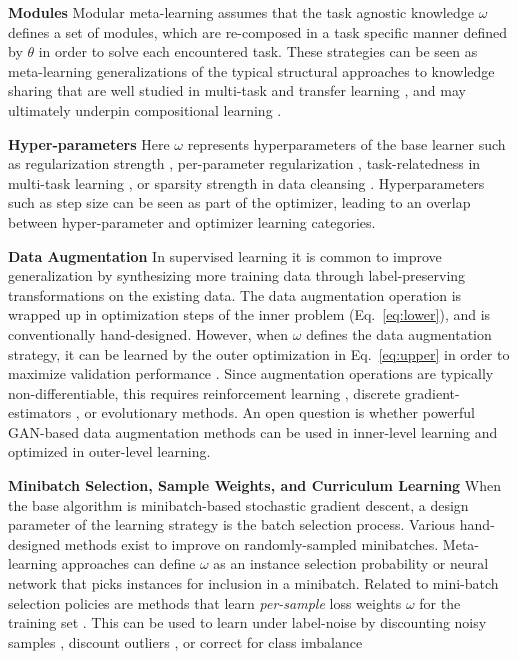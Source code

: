 \documentclass[10pt,journal,compsoc]{IEEEtran}
\newcommand{\keypoint}[1]{\vspace{0.1cm}\noindent\textbf{#1}\quad}
\begin{document}
\keypoint{Modules} Modular meta-learning \cite{alet2018modularmetalearning,alet2019modularmeta} assumes that the task agnostic knowledge $\omega$ defines a set of modules, which are re-composed in a task specific manner defined by $\theta$ in order to solve each encountered task. These strategies can be seen as meta-learning generalizations of the typical structural approaches to knowledge sharing that are well studied in multi-task and transfer learning \cite{yang2017deepmtrl,fernando2017pathnet,meyerson2019modular}, and may ultimately underpin compositional learning \cite{lake2019compositional}.

\keypoint{Hyper-parameters} Here $\omega$ represents hyperparameters of the base learner such as regularization strength \cite{franceschi2018bilevel, micaelli2020nongreedy}, per-parameter regularization \cite{balaji2018metareg}, task-relatedness in multi-task learning \cite{franceschi2017hyperopt}, or sparsity strength in data cleansing \cite{franceschi2017hyperopt}. Hyperparameters such as step size \cite{li2017meta,antoniou2018maml, micaelli2020nongreedy} can be seen as part of the optimizer, leading to an overlap between hyper-parameter and optimizer learning categories.



\keypoint{Data Augmentation} In supervised learning it is common to improve generalization by synthesizing more training data through label-preserving transformations on the existing data. The data augmentation operation is wrapped up in optimization steps of the inner problem (Eq.~\ref{eq:lower}), and is conventionally hand-designed. However, when $\omega$ defines the data augmentation strategy, it can be learned by the outer optimization in Eq.~\ref{eq:upper} in order to maximize validation performance \cite{cubuk2019autoaug}. Since augmentation operations are typically non-differentiable, this requires reinforcement learning \cite{cubuk2019autoaug}, discrete gradient-estimators \cite{li2020dada}, or evolutionary \cite{volpi2019learnaugment} methods. An open question is whether powerful GAN-based data augmentation methods \cite{antoniou2017data} can be used in inner-level learning and optimized in outer-level learning.



\keypoint{Minibatch Selection, Sample Weights, and Curriculum Learning}
When the base algorithm is minibatch-based stochastic gradient descent, a design parameter of the learning strategy is the batch selection process. Various hand-designed methods \cite{zhang2019active} exist to improve on randomly-sampled minibatches. Meta-learning approaches can define $\omega$ as an instance selection probability \cite{loshchilov2016onlinebatch} or neural network that picks instances \cite{fan2018learnteach} for inclusion in a minibatch. Related to mini-batch selection policies are methods that learn \emph{per-sample} loss weights $\omega$ for the training set \cite{shu2019metaweightnet,ren2018l2rw}. This can be used to learn under label-noise by discounting noisy samples \cite{shu2019metaweightnet,ren2018l2rw}, discount outliers \cite{franceschi2017hyperopt}, or correct for class imbalance \cite{shu2019metaweightnet}
\end{document}
